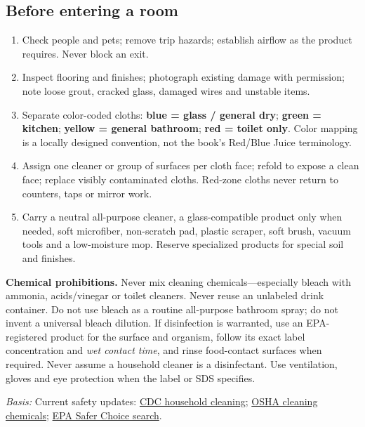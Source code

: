 \documentclass[10pt,letterpaper,oneside]{article}
\newcommand{\sources}[1]{\par{\small\color{graytext}\textit{Basis:} #1}\par}
\newcommand{\refurl}[2]{\href{#2}{#1}}
\begin{document}
\subsection{Before entering a room}
\begin{enumerate}
\item Check people and pets; remove trip hazards; establish airflow as the product requires. Never block an exit.
\item Inspect flooring and finishes; photograph existing damage with permission; note loose grout, cracked glass, damaged wires and unstable items.
\item Separate color-coded cloths: \textbf{blue = glass / general dry}; \textbf{green = kitchen}; \textbf{yellow = general bathroom}; \textbf{red = toilet only}. Color mapping is a locally designed convention, not the book's Red/Blue Juice terminology.
\item Assign one cleaner or group of surfaces per cloth face; refold to expose a clean face; replace visibly contaminated cloths. Red-zone cloths never return to counters, taps or mirror work.
\item Carry a neutral all-purpose cleaner, a glass-compatible product only when needed, soft microfiber, non-scratch pad, plastic scraper, soft brush, vacuum tools and a low-moisture mop. Reserve specialized products for special soil and finishes.
\end{enumerate}
\begin{safetybox}\textbf{Chemical prohibitions.} Never mix cleaning chemicals---especially bleach with ammonia, acids/vinegar or toilet cleaners. Never reuse an unlabeled drink container. Do not use bleach as a routine all-purpose bathroom spray; do not invent a universal bleach dilution. If disinfection is warranted, use an EPA-registered product for the surface and organism, follow its exact label concentration and \emph{wet contact time}, and rinse food-contact surfaces when required. Never assume a household cleaner is a disinfectant. Use ventilation, gloves and eye protection when the label or SDS specifies.\end{safetybox}
\sources{Current safety updates: \refurl{CDC household cleaning}{https://www.cdc.gov/hygiene/about/when-and-how-to-clean-and-disinfect-your-home.html}; \refurl{OSHA cleaning chemicals}{https://www.osha.gov/sites/default/files/publications/OSHA3512.pdf}; \refurl{EPA Safer Choice search}{https://www.epa.gov/saferchoice/products}.}
\end{document}
